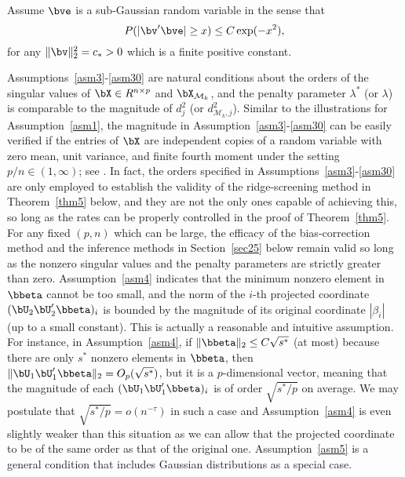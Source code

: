 \begin{assumption}\label{asm5}
    Assume $\bve$ is a sub-Gaussian random variable in the sense that
    \[P(|\bv'\bve|\geq x)\leq C\exp(-x^2),\]
    for any $\|\bv\|_2^2=c_*>0$ which is a finite positive constant.
\end{assumption}
Assumptions~\ref{asm3}-\ref{asm30} are natural conditions about the orders of the singular values of $\bX\in R^{n\times p}$ and $\bX_{\mathcal{M}_k}$, and the penalty parameter $\lambda^*$ (or $\lambda$) is comparable to the magnitude of $d_j^2$ (or $d_{\mathcal{M}_k,j}^2$). Similar to the illustrations for Assumption~\ref{asm1}, the magnitude in Assumption~\ref{asm3}-\ref{asm30} can be easily verified if the entries of $\bX$  are independent copies of a random variable with zero mean, unit variance, and
finite fourth moment under the setting  $p/n\in(1,\infty)$; see \cite{bai1993limit}. In fact, the orders specified in Assumptions~\ref{asm3}-\ref{asm30} are only employed to establish the validity of the ridge-screening method in Theorem~\ref{thm5} below, and they are not the only ones capable of achieving this, so long as the rates can be  properly controlled in the proof of Theorem~\ref{thm5}. 
For any fixed $(p,n)$ which can be large,  the efficacy of the bias-correction method and the inference methods in Section~\ref{sec25} below remain valid so long as the nonzero singular values and the penalty parameters are strictly greater than zero.
Assumption~\ref{asm4} indicates that the minimum nonzero element in $\bbeta$ cannot be too small, and the norm of the $i$-th projected coordinate $(\bU_2\bU_2'\bbeta)_i$ is bounded by the  magnitude of its original coordinate $|\beta_i|$ (up to a small constant).  This is actually a reasonable and intuitive assumption.  For instance, in Assumption~\ref{asm4}, if $\|\bbeta\|_2\leq C\sqrt{s^*}$ (at most) because there are only $s^*$ nonzero elements in $\bbeta$, then $\|\bU_1\bU_1'\bbeta\|_2=O_p(\sqrt{s^*})$, but it is a $p$-dimensional vector, meaning that the magnitude of each $(\bU_1\bU_1'\bbeta)_i$ is of order $\sqrt{s^*/p}$ on average. We may postulate that $\sqrt{s^*/p}=o(n^{-\tau})$ in such a case and
Assumption~\ref{asm4} is even slightly weaker than this situation as we can allow that the projected coordinate to be of the same order as that of the original one.
Assumption~\ref{asm5} is a general condition that includes Gaussian distributions as a special case.

